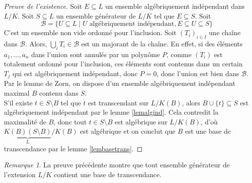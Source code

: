 \documentclass{article}
\renewcommand{\subset}{\subseteq}
\theoremstyle{plain}
\theoremstyle{definition}
\theoremstyle{remark}
\newtheorem*{remark}{Remarque}
\begin{document}
\begin{proof}[Preuve de l'existence]
    Soit $E \subseteq L$ un ensemble algébriquement indépendant dans $L/K$. Soit $S \subseteq L$ un ensemble générateur de $L/K$ tel que $E \subset S$. Soit
    \[\mathcal{B} = \{U \subseteq L \mid U \text{ algébriquement indépendant}, E  \subseteq U \subseteq S \}\]
    C'est un ensemble non vide ordonné pour l'inclusion. Soit $(T_i)_{i\in I}$ une chaîne dans $\mathcal{B}$. Alors, $\bigcup\limits_i T_i \in \mathcal{B}$ est un majorant de la chaîne. En effet, si des éléments $a_1,\dots,a_n$ dans l'union sont annulés par un polynôme $P$, comme $(T_i)$ est totalement ordonné pour l'inclusion, ces éléments sont contenus dans un certain $T_j$ qui est algébriquement indépendant, donc $P = 0$, donc l'union est bien dans $\mathcal{B}$. Par le lemme de Zorn, on dispose d'un ensemble algébriquement indépendant maximal $B$ contenu dans $S$. \\
    S'il existe $t \in S \setminus B$ tel que $t$ est transcendant sur $L/K(B)$, alors $B \cup \{t\} \subseteq S$ est algébriquement indépendant par le lemme \ref{lemalgind}. Cela contredit la maximalité de $B$, donc tout $t \in S \setminus B$ est algébrique sur $L/K(B)$, d'où $\underbrace{K(B)(S\setminus B)}_L/K(B)$ est algébrique et on conclut que $B$ est une base de transcendance par le lemme \ref{lembasetrans}.
\end{proof}

\begin{remark}
    La preuve précédente montre que tout ensemble générateur de l'extension $L/K$ contient une base de transcendance.
\end{remark}
\end{document}
